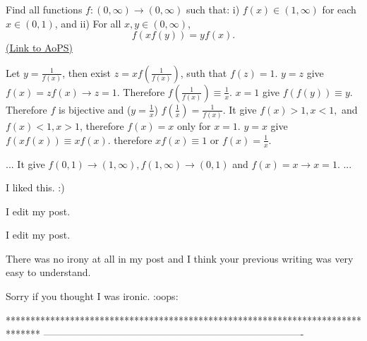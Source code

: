 \begin{problem}
	Find all functions $ f: (0,\infty)\longrightarrow (0,\infty)$ such that:
i) $ f(x) \in (1, \infty)$ for each $ x\in (0,1)$, and
ii) For all $x,y \in (0,\infty)$,
\[ f(xf(y)) = yf(x).\]
	\flushright \href{https://artofproblemsolving.com/community/c6h277031}{(Link to AoPS)}
\end{problem}



\begin{solution}
	Let $ y = \frac {1}{f(x)}$, then exist $ z = xf(\frac {1}{f(x)})$, suth that $ f(z) = 1$.
$ y = z$ give $ f(x) = zf(x)\to z = 1$. Therefore $ f(\frac {1}{f(x)})\equiv \frac 1x.$
$ x = 1$ give $ f(f(y))\equiv y$. Therefore $ f$ is bijective and ($ y = \frac 1x$) $ f(\frac 1x) = \frac {1}{f(x)}$.
It give $ f(x) > 1,x < 1,$ and $ f(x) < 1,x > 1$, therefore $ f(x) = x$ only for $ x = 1$.
$ y = x$ give $ f(xf(x))\equiv xf(x)$. therefore $ xf(x)\equiv 1$ or $ f(x) = \frac 1x$.
\end{solution}



\begin{solution}
	\begin{tcolorbox} ...
It give $ f(0,1)\to (1,\infty), f(1,\infty)\to (0,1)$ and $ f(x) = x\to x = 1$.
...\end{tcolorbox}

I liked this.
:)
\end{solution}



\begin{solution}
	I edit my post.
\end{solution}



\begin{solution}
	\begin{tcolorbox}I edit my post.\end{tcolorbox}

There was no irony at all in my post and I think your previous writing was very easy to understand.

Sorry if you thought I was ironic.  :oops:
\end{solution}
*******************************************************************************
-------------------------------------------------------------------------------

